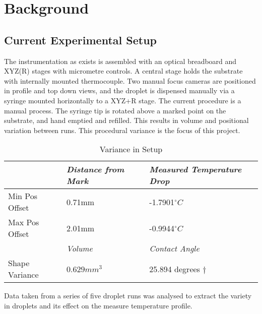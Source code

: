 \chapter{Background}\label{C:back}

\section{Current Experimental Setup}
The instrumentation as exists is assembled with an optical breadboard and XYZ(R) stages with micrometre controls. A central stage holds the substrate with internally mounted thermocouple. Two manual focus cameras are positioned in profile and top down views, and the droplet is dispensed manually via a syringe mounted horizontally to a XYZ+R stage.
The current procedure is a manual process. The syringe tip is rotated above a marked point on the substrate, and hand emptied and refilled. This results in volume and positional variation between runs. This procedural variance is the focus of this project.

\begin{table}[h]
    \centering
    \begin{tabular}{|l|l|l|}
    \hline
                   & \textit{Distance from Mark}          & \textit{Measured Temperature Drop} \\ \hline
    Min Pos Offset & 0.71mm                     &-1.7901$^{\circ}C$    \\ \hline
    Max Pos Offset &       2.01mm    &  -0.9944$^{\circ}C$    \\ \hline
                   & \textit{Volume}            & \textit{Contact Angle}          \\ \hline
    Shape Variance & $0.629mm^3$ & 25.894 degrees $\dagger$                \\ \hline
    \end{tabular}
    \caption{Variance in Setup}
    \end{table}

Data taken from a series of five droplet runs was analysed to extract the variety in droplets and its effect on the measure temperature profile. 

